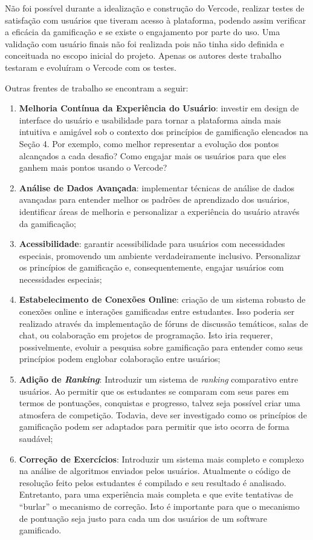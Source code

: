 \documentclass[12pt]{article}
\begin{document}
Não foi possível durante a idealização e construção do Vercode, realizar testes de satisfação com usuários que tiveram acesso à plataforma, podendo assim verificar a eficácia da gamificação e se existe o engajamento por parte do uso. Uma validação com usuário finais não foi realizada pois não tinha sido definida e conceituada no escopo inicial do projeto. Apenas os autores deste trabalho testaram e evoluíram o Vercode com os testes. 

Outras frentes de trabalho  se encontram a seguir:

\begin{enumerate}
    \item \textbf{Melhoria Contínua da Experiência do Usuário}: investir em design de interface do usuário e usabilidade para tornar a plataforma ainda mais intuitiva e amigável sob o contexto dos princípios de gamificação elencados na Seção 4. Por exemplo, como melhor representar a evolução dos pontos alcançados a cada desafio? Como engajar mais os usuários para que eles ganhem mais pontos usando o Vercode? 
    \item \textbf{Análise de Dados Avançada}: implementar técnicas de análise de dados avançadas para entender melhor os padrões de aprendizado dos usuários, identificar áreas de melhoria e personalizar a experiência do usuário através da gamificação;
    \item \textbf{Acessibilidade}: garantir acessibilidade para usuários com necessidades especiais, promovendo um ambiente verdadeiramente inclusivo. Personalizar os  princípios de gamificação e,  consequentemente, engajar usuários com necessidades especiais;
    \item \textbf{Estabelecimento de Conexões Online}: criação de um sistema robusto de conexões online e interações gamificadas entre estudantes. Isso poderia ser realizado através da implementação de fóruns de discussão temáticos, salas de chat, ou colaboração em projetos de programação. Isto iria requerer, possivelmente, evoluir a pesquisa sobre gamificação para entender como seus princípios podem englobar colaboração entre usuários;
    \item \textbf{Adição de \textit{Ranking}}: Introduzir um sistema de \textit{ranking} comparativo entre usuários. Ao permitir que os estudantes se comparam com seus pares em termos de pontuações, conquistas e progresso, talvez seja possível criar uma atmosfera de competição. Todavia, deve ser investigado como os princípios de gamificação podem ser adaptados para permitir que isto ocorra de forma saudável;
    \item \textbf{Correção de Exercícios}: Introduzir um sistema mais completo e complexo na análise de algoritmos enviados pelos usuários. Atualmente o código de resolução feito pelos estudantes é compilado e seu resultado é analisado. Entretanto, para uma experiência mais completa e que evite tentativas de “burlar” o mecanismo de correção. Isto é importante para  que o mecanismo de pontuação seja justo para cada um dos usuários  de um software gamificado.
\end{enumerate}
\end{document}
